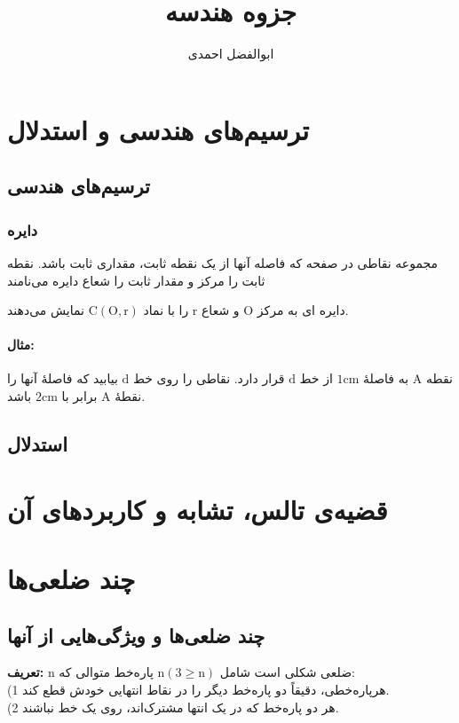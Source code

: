 \documentclass[12pt, a4paper, twoside]{book}
\title{جزوه هندسه}
\author{ابوالفضل احمدی}
\begin{document}
	\maketitle
	\setcounter{page}{1}
\chapter{ترسیم‌های هندسی و استدلال}

\section{ترسیم‌های هندسی}

\subsection{دایره}
مجموعه نقاطی در صفحه که فاصله آنها از یک نقطه ثابت، مقداری ثابت باشد. نقطه ثابت را مرکز و مقدار ثابت را شعاع دایره می‌نامند

دایره ای به مرکز
 $\mathrm{O}$
  و شعاع
   $\mathrm{r}$
    را با نماد
 $\mathrm{C}(\mathrm{O},\mathrm{r})$
  نمایش می‌دهند.

\subsubsection*{مثال:}
نقطه 
$\mathrm{A}$
به فاصلۀ
$\mathrm{1cm}$
از خط 
$\mathrm{d}$
قرار دارد. نقاطی را روی خط
$\mathrm{d}$
بیابید که فاصلۀ آنها را نقطۀ
$\mathrm{A}$
برابر با
$\mathrm{2cm}$
باشد.

\section{استدلال}

\chapter{قضیه‌ی تالس، تشابه و کاربردهای آن}


\chapter{چند ضلعی‌ها}

\section{چند ضلعی‌ها و ویژگی‌هایی از آنها}

\textbf{تعریف:}
n
ضلعی شکلی است شامل 
$\text{n}(3 \geq \text{n})$
پاره‌خط متوالی که:\\
(1 هرپاره‌خطی، دقیقاً دو پاره‌خط دیگر را در نقاط انتهایی خودش قطع کند.\\
(2 هر دو پاره‌خط که در یک انتها مشترک‌اند، روی یک خط نباشند.
\end{document}
